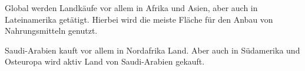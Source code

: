 \documentclass[./entry.tex]{subfiles}
\begin{document}
    Global werden Landkäufe vor allem in Afrika und Asien, aber auch in Lateinamerika getätigt.
    Hierbei wird die meiste Fläche für den Anbau von Nahrungsmitteln genutzt.

    Saudi-Arabien kauft vor allem in Nordafrika Land.
    Aber auch in Südamerika und Osteuropa wird aktiv Land von Saudi-Arabien gekauft.
\end{document}
